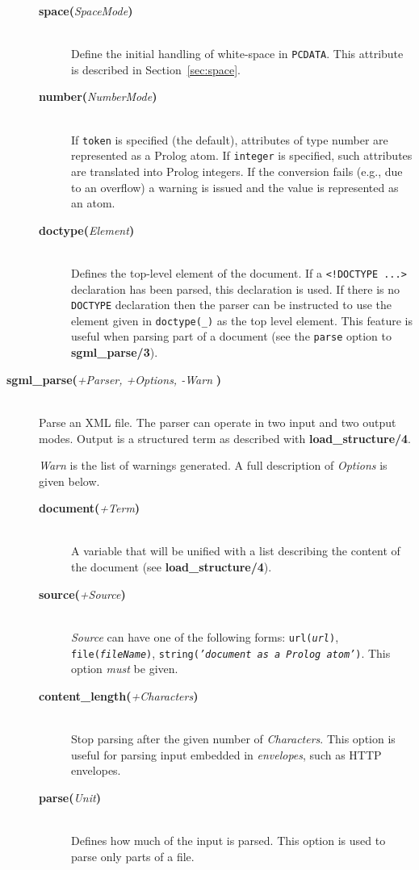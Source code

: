 \begin{description}
\begin{description}
  \item[{\bf space}{\bf (}{\it SpaceMode}{\bf )}]\mbox{}\\
    Define the initial handling of white-space in {\tt PCDATA}.  This attribute is
    described in Section~\ref{sec:space}.
  \item[{\bf number}{\bf (}{\it NumberMode}{\bf )}]\mbox{}\\
    If {\tt token} is specified (the default), attributes of type number are represented as a Prolog atom.
    If {\tt integer} is specified, such attributes are translated into Prolog integers.  If
    the conversion fails (e.g., due to an overflow) a warning is issued and the
    value is represented as an atom.
  \item[{\bf doctype}{\bf (}{\it Element}{\bf )}]\mbox{}\\
    Defines the top-level element of the document. If a \verb$<!DOCTYPE ...>$
    declaration has been parsed, this declaration is used. If there is no
    {\tt DOCTYPE} declaration then the 
    parser can be instructed to use the element given in
    {\tt doctype(\_)} as the top level element. This feature is
    useful when parsing part of a document (see the {\tt parse} option to
    {\bf sgml\_parse/3}).
  \end{description}
  
\item[{\bf sgml\_parse}{\bf (}{\it +Parser, +Options, -Warn}{\bf
    )}]\mbox{}\\Parse an XML file.  The parser can operate in two input and
  two output modes. Output is a structured term as described with {\bf
    load\_structure/4}.
  
  {\it Warn} is the list of warnings generated. A full description of
  \emph{Options} is given below.

  \begin{description}
  \item[{\bf document}{\bf (}{\it +Term}{\bf )}]\mbox{}\\
    A variable that will be unified with a list describing the content of 
    the document (see {\bf load\_structure/4}). 
  \item[{\bf source}{\bf (}{\it +Source}{\bf )}]\mbox{}\\
    {\it Source} can have one of the following forms:
   {\tt url({\it url})}, {\tt file({\it fileName})},
  {\tt string({\it 'document as a Prolog atom'})}.
  This option \emph{must} be given.
  \item[{\bf content\_length}{\bf (}{\it +Characters}{\bf )}]\mbox{}\\
    Stop parsing after the given number of
    {\it Characters}.  This option is useful for parsing
    input embedded in \emph{envelopes}, such as HTTP envelopes.
  \item[{\bf parse}{\bf (}{\it Unit}{\bf )}]\mbox{}\\
    Defines how much of the input is parsed.  This option is used to parse
    only parts of a file.
    


\end{description}
\end{description}
